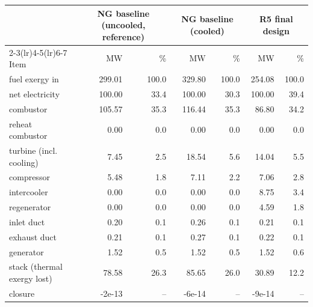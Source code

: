 \begin{tabular}{lrrrrrr}\toprule
 & \multicolumn{2}{c}{NG baseline (uncooled, reference)} & \multicolumn{2}{c}{NG baseline (cooled)} & \multicolumn{2}{c}{R5 final design}\\
\cmidrule(lr){2-3}\cmidrule(lr){4-5}\cmidrule(lr){6-7}
Item & MW & \% & MW & \% & MW & \%\\\midrule
fuel exergy in & 299.01 & 100.0 & 329.80 & 100.0 & 254.08 & 100.0\\
net electricity & 100.00 & 33.4 & 100.00 & 30.3 & 100.00 & 39.4\\
\midrule
combustor & 105.57 & 35.3 & 116.44 & 35.3 & 86.80 & 34.2\\
reheat combustor & 0.00 & 0.0 & 0.00 & 0.0 & 0.00 & 0.0\\
turbine (incl. cooling) & 7.45 & 2.5 & 18.54 & 5.6 & 14.04 & 5.5\\
compressor & 5.48 & 1.8 & 7.11 & 2.2 & 7.06 & 2.8\\
intercooler & 0.00 & 0.0 & 0.00 & 0.0 & 8.75 & 3.4\\
regenerator & 0.00 & 0.0 & 0.00 & 0.0 & 4.59 & 1.8\\
inlet duct & 0.20 & 0.1 & 0.26 & 0.1 & 0.21 & 0.1\\
exhaust duct & 0.21 & 0.1 & 0.27 & 0.1 & 0.22 & 0.1\\
generator & 1.52 & 0.5 & 1.52 & 0.5 & 1.52 & 0.6\\
stack (thermal exergy lost) & 78.58 & 26.3 & 85.65 & 26.0 & 30.89 & 12.2\\
closure & -2e-13 & -- & -6e-14 & -- & -9e-14 & --\\
\bottomrule\end{tabular}